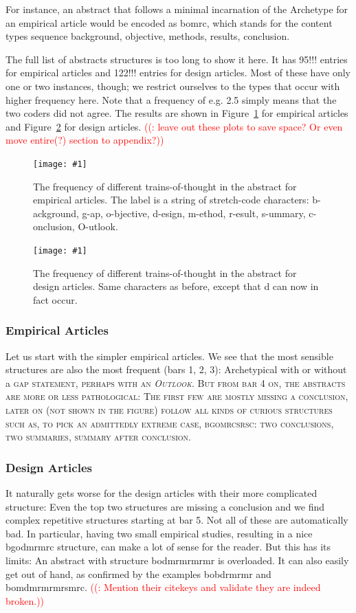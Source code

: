 \documentclass[10pt,journal,compsoc]{IEEEtran}
\newcommand{\Plot}[2]{%
	\begin{figure}[htb]%
		\centering\texttt{[image: \#1]}%
		\vspace{-4mm}\caption{#2}\label{#1}%
	\end{figure}}
\newcommand{\Cb}[1]{\bgroup\scshape #1\egroup}  %
\newcounter{todonumber}
\newcommand{\Todo}[1]{\stepcounter{todonumber}\textcolor{red}{\sffamily ((\arabic{todonumber}: #1))}}
\begin{document}
For instance, an abstract that follows a minimal incarnation of the Archetype
for an empirical article would be encoded as bomrc, which stands for
the content types sequence background, objective, methods, results, conclusion.

The full list of abstracts structures is too long to show it here.
It has 95!!! entries for empirical articles and 122!!! entries for design articles.
Most of these have only one or two instances, though;
we restrict ourselves to the types that occur with higher frequency here.
Note that a frequency of e.g. 2.5 simply means that the two coders did not agree.
The results are shown in
Figure~\ref{ab_topicstructure_freqs_empir} for empirical articles and
Figure~\ref{ab_topicstructure_freqs_design} for design articles.
\Todo{leave out these plots to save space? Or even move entire(?) section to appendix?}

\Plot{ab_topicstructure_freqs_empir}{%
  The frequency of different trains-of-thought in the abstract for empirical articles.
  The label is a string of stretch-code characters:
  b-ackground, g-ap, o-bjective, d-esign, m-ethod, r-esult, s-ummary, c-onclusion, O-utlook.}
\Plot{ab_topicstructure_freqs_design}{%
  The frequency of different trains-of-thought in the abstract for design articles.
  Same characters as before, except that d can now in fact occur.}



\subsubsection{Empirical Articles}

Let us start with the simpler empirical articles.
We see that the most sensible structures are also the most frequent (bars 1, 2, 3):
Archetypical with or without a \Cb{gap} statement, perhaps with an \emph{Outlook}.
But from bar 4 on, the abstracts are more or less pathological:
The first few are mostly missing a conclusion, later on (not shown in the figure)
follow all kinds of curious structures such as, to pick an admittedly extreme case,
bgomrcsrsc: two conclusions, two summaries, summary after conclusion.

\subsubsection{Design Articles}

It naturally gets worse for the design articles with their more complicated structure:
Even the top two structures are missing a conclusion
and we find complex repetitive structures starting at bar 5.
Not all of these are automatically bad.
In particular, having two small empirical studies, resulting in a nice bgodmrmrc structure,
can make a lot of sense for the reader.
But this has its limits: An abstract with structure bodmrmrmrmr is overloaded.
It can also easily get out of hand, as confirmed by the examples bobdrmrmr and bomdmrmrmrsmrc.
\Todo{Mention their citekeys and validate they are indeed broken.}
\end{document}
